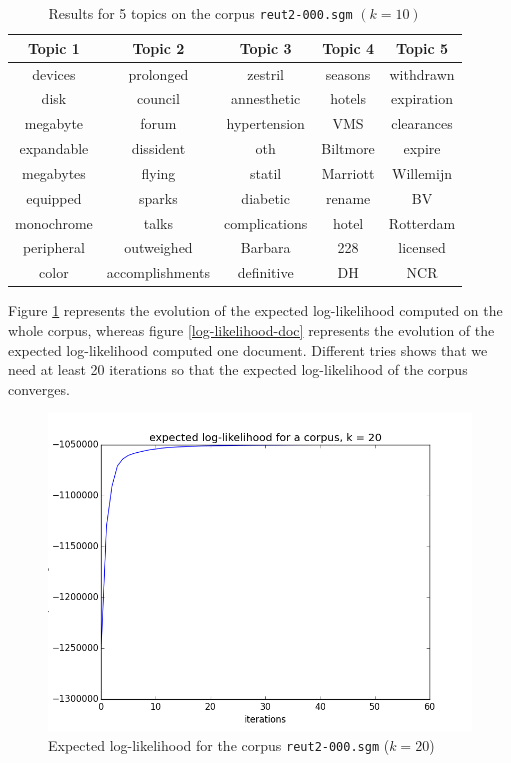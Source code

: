 \documentclass{article}
\begin{document}
\begin{table}[ht!]
\begin{center}
\begin{tabular}{ccccc}
\hline
\textbf{Topic 1} & \textbf{Topic 2} & \textbf{Topic 3}  & \textbf{Topic 4} & \textbf{Topic 5}\\
\hline
devices & prolonged & zestril & seasons & withdrawn \\
disk & council & annesthetic &  hotels & expiration  \\
megabyte & forum & hypertension & VMS & clearances \\
expandable & dissident & oth & Biltmore  & expire \\
megabytes & flying & statil & Marriott & Willemijn \\
equipped &  sparks & diabetic & rename & BV \\
monochrome &talks & complications & hotel & Rotterdam  \\
peripheral & outweighed & Barbara & 228 & licensed \\
color & accomplishments & definitive & DH  & NCR \\
\hline
\end{tabular}
\caption{Results for 5 topics on the corpus \texttt{reut2-000.sgm} $(k=10)$}
\label{voc-result}
\end{center}
\end{table}

Figure \ref{log-likelihood-corpus} represents the evolution of the expected log-likelihood computed on the whole corpus, whereas figure \ref{log-likelihood-doc} represents the evolution of the expected log-likelihood computed one document. Different tries shows that we need at least 20 iterations so that the expected log-likelihood of the corpus converges.

\begin{figure}[ht!]
\begin{center}
\includegraphics[width=0.5\linewidth]{../img/k=20/log_likelihood_corpus_k=20.png}
\caption{Expected log-likelihood for the corpus \texttt{reut2-000.sgm} ($k=20$)}
\label{log-likelihood-corpus}
\end{center}
\end{figure}
\end{document}
